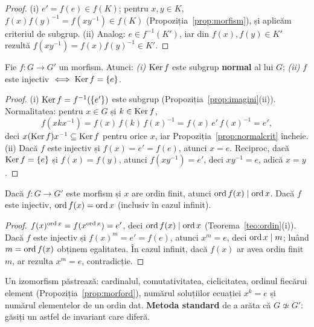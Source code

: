 \begin{proof}
(i) $e'=f(e)\in f(K)$; pentru $x,y\in K$, $f(x)f(y)^{-1}=f(xy^{-1})\in f(K)$ (Propoziția~\ref{prop:morfism}), și aplicăm criteriul de subgrup. (ii) Analog: $e\in f^{-1}(K')$, iar din $f(x),f(y)\in K'$ rezultă $f(xy^{-1})=f(x)f(y)^{-1}\in K'$.
\end{proof}

\begin{teorema}[nucleul]\label{teo:nucleu}
Fie $f:G\to G'$ un morfism. Atunci:
\emph{(i)} $\operatorname{Ker} f$ este subgrup \textbf{normal} al lui $G$;\quad
\emph{(ii)} $f$ este injectiv $\iff\operatorname{Ker} f=\{e\}$.
\end{teorema}

\begin{proof}
(i) $\operatorname{Ker} f=f^{-1}(\{e'\})$ este subgrup (Propoziția~\ref{prop:imagini}(ii)). Normalitatea: pentru $x\in G$ și $k\in\operatorname{Ker} f$,
\[
f(xkx^{-1})=f(x)\,f(k)\,f(x)^{-1}=f(x)\,e'\,f(x)^{-1}=e',
\]
deci $x(\operatorname{Ker} f)x^{-1}\subseteq\operatorname{Ker} f$ pentru orice $x$, iar Propoziția~\ref{prop:normalcrit} încheie.
(ii) Dacă $f$ este injectiv și $f(x)=e'=f(e)$, atunci $x=e$. Reciproc, dacă $\operatorname{Ker} f=\{e\}$ și $f(x)=f(y)$, atunci $f(xy^{-1})=e'$, deci $xy^{-1}=e$, adică $x=y$.
\end{proof}

\begin{propozitie}\label{prop:morford}
Dacă $f:G\to G'$ este morfism și $x$ are ordin finit, atunci $\operatorname{ord} f(x)\mid\operatorname{ord} x$. Dacă $f$ este injectiv, $\operatorname{ord} f(x)=\operatorname{ord} x$ (inclusiv în cazul infinit).
\end{propozitie}

\begin{proof}
$f(x)^{\operatorname{ord} x}=f(x^{\operatorname{ord} x})=e'$, deci $\operatorname{ord} f(x)\mid \operatorname{ord} x$ (Teorema~\ref{teo:ordin}(i)). Dacă $f$ este injectiv și $f(x)^m=e'=f(e)$, atunci $x^m=e$, deci $\operatorname{ord} x\mid m$; luând $m=\operatorname{ord} f(x)$ obținem egalitatea. În cazul infinit, dacă $f(x)$ ar avea ordin finit $m$, ar rezulta $x^m=e$, contradicție.
\end{proof}

\begin{observatie}\label{obs:invarianti}
Un izomorfism păstrează: cardinalul, comutativitatea, ciclicitatea, ordinul fiecărui element (Propoziția~\ref{prop:morford}), numărul soluțiilor ecuației $x^k=e$ și numărul elementelor de un ordin dat. \textbf{Metoda standard} de a arăta că $G\not\simeq G'$: găsiți un astfel de invariant care diferă.
\end{observatie}


